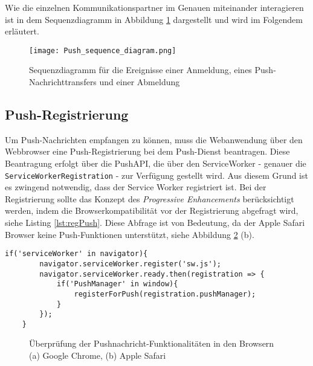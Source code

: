 Wie die einzelnen Kommunikationspartner im Genauen miteinander interagieren ist in dem Sequenzdiagramm in Abbildung \ref{img:sequenceDiagram} dargestellt und wird im Folgendem erläutert. 

\newpage
\begin{figure}[!htb]
    \centering
    \texttt{[image: Push\_sequence\_diagram.png]}
    \caption{Sequenzdiagramm für die Ereignisse einer Anmeldung, eines Push-Nachrichttransfers und einer Abmeldung \cite{PushW3}}
    \label{img:sequenceDiagram}
\end{figure}
\newpage


\subsection{Push-Registrierung}\label{sec:pushRegistrirung}

Um Push-Nachrichten empfangen zu können, muss die Webanwendung über den Webbrowser eine Push-Registrierung bei dem Push-Dienst beantragen. Diese Beantragung erfolgt über die PushAPI, die über den ServiceWorker - genauer die \texttt{ServiceWorkerRegistration} - zur Verfügung gestellt wird. Aus diesem Grund ist es zwingend notwendig, dass der Service Worker registriert ist. 
Bei der Registrierung sollte das Konzept des \textit{Progressive Enhancements} berücksichtigt werden, indem die Browserkompatibilität vor der Registrierung abgefragt wird, siehe Listing \ref{lst:regPush}. Diese Abfrage ist von Bedeutung, da der Apple Safari Browser keine Push-Funktionen unterstützt, siehe Abbildung \ref{img:PushManagerBrowser} (b).

\begin{lstlisting}[caption={Push-Registrierung unter Berücksichtigung der Konzepte des Progressive Enhancements}, label={lst:regPush}, float={!htb}]
    if('serviceWorker' in navigator){
        navigator.serviceWorker.register('sw.js');
        navigator.serviceWorker.ready.then(registration => {
            if('PushManager' in window){
                registerForPush(registration.pushManager);
            }
        });
    }
\end{lstlisting}

\begin{figure}[!htb]
    \centering
    \qquad
    \caption{Überprüfung der Pushnachricht-Funktionalitäten in den Browsern (a) Google Chrome, (b) Apple Safari}
    \label{img:PushManagerBrowser}
\end{figure}

